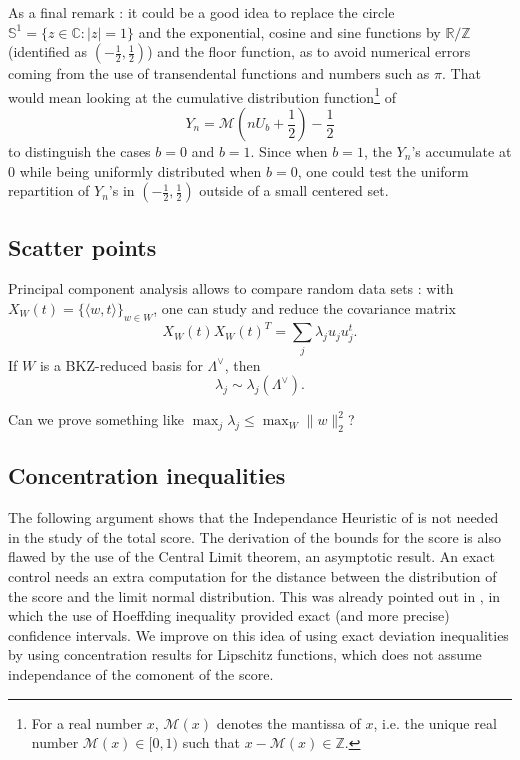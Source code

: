 \documentclass{article}
\begin{document}
As a final remark : it could be a good idea to replace the circle $\mathbb S^1 = \{z\in \mathbb C : |z|=1\}$ and the exponential, cosine and sine functions by $\mathbb R / \mathbb Z$ (identified as $(-\frac{1}{2} , \frac{1}{2})$) and the floor function, as to avoid numerical errors coming from the use of transendental functions and numbers such as $\pi$. That would mean looking at the cumulative distribution function\footnote{For a real number $x$, $\mathcal M(x)$ denotes the mantissa of $x$, i.e. the unique real number $\mathcal M(x)\in [0,1)$ such that $x-\mathcal M(x)\in \mathbb Z$.} of 
$$Y_n = \mathcal M ( n U_b +\frac{1}{2} ) -\frac{1}{2} $$
to distinguish the cases $b=0$ and $b=1$. Since when $b=1$, the $Y_n$'s accumulate at 0 while being uniformly distributed when $b=0$, one could test the uniform repartition of $Y_n$'s in  $(-\frac{1}{2} , \frac{1}{2})$ outside of a small centered set.


\subsection{Scatter points}

Principal component analysis allows to compare random data sets : with $X_W(t) = \{ \langle w , t \rangle \}_{w\in W}$, one can study and reduce the covariance matrix
$$X_W(t) X_W(t)^T =\sum_j \lambda_j u_ju_j^t.$$
If $W$ is a BKZ-reduced basis for $\Lambda^\vee$, then 
$$ \lambda_j \sim \lambda_j(\Lambda^\vee).$$

Can we prove something like $\max_j \lambda_j \leq \max_W \|w\|_2^2$?

\subsection{Concentration inequalities}

The following argument shows that the Independance Heuristic of \cite{} is not needed in the study of the total score. The derivation of the bounds for the score is also flawed by the use of the Central Limit theorem, an asymptotic result. An exact control needs an extra computation for the distance between the distribution of the score and the limit normal distribution. This was already pointed out in \cite{}, in which the use of Hoeffding inequality provided exact (and more precise) confidence intervals. We improve on this idea of using exact deviation inequalities by using concentration results for Lipschitz functions, which does not assume independance of the comonent of the score.     
\end{document}

